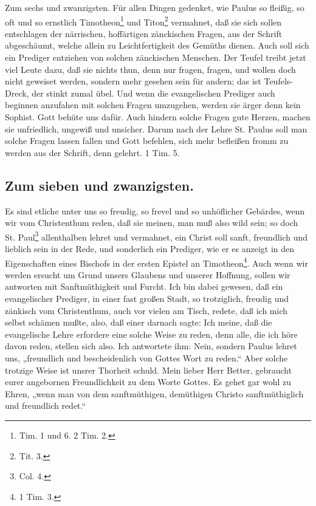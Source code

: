 Zum sechs und zwanzigsten. Für allen Dingen gedenket, wie Paulus so fleißig, so oft und so ernstlich Timotheon\footnote{Tim. 1 und 6. 2 Tim. 2.} und Titon\footnote{Tit. 3.} vermahnet, daß sie sich sollen entschlagen der närrischen, hoffärtigen zänckischen Fragen, aus der Schrift abgeschäumt, welche allein zu Leichtfertigkeit des Gemüths dienen. Auch soll sich ein Prediger entziehen von solchen zänckischen Menschen. Der Teufel treibt jetzt viel Leute dazu, daß sie nichts thun, denn nur fragen, fragen, und wollen doch nicht geweiset werden, sondern mehr gesehen sein für andern; das ist Teufels-Dreck, der stinkt zumal übel. Und wenn die evangelischen Prediger auch beginnen anzufahen mit solchen Fragen umzugehen, werden sie ärger denn kein Sophist. Gott behüte uns dafür. Auch hindern solche Fragen gute Herzen, machen sie unfriedlich, ungewiß und unsicher. Darum nach der Lehre St. Paulus soll man solche Fragen lassen fallen und Gott befehlen, sich mehr befleißen fromm zu werden aus der Schrift, denn gelehrt. 1 Tim. 5.

\subsection*{Zum sieben und zwanzigsten.}

Es sind etliche unter uns so freudig, so frevel und so unhöflicher Gebärdes, wenn wir vom Christenthum reden, daß sie meinen, man muß also wild sein; so doch St. Paul\footnote{Col. 4.} allenthalben lehret und vermahnet, ein Christ soll sanft, freundlich und lieblich sein in der Rede, und sonderlich ein Prediger, wie er es anzeigt in den Eigenschaften eines Bischofs in der ersten Epistel an Timotheon\footnote{1 Tim. 3.}. Auch wenn wir werden ersucht um Grund unsers Glaubens und unserer Hoffnung, sollen wir antworten mit Sanftmüthigkeit und Furcht. Ich bin dabei gewesen, daß ein evangelischer Prediger, in einer fast großen Stadt, so trotziglich, freudig und zänkisch vom Christenthum, auch vor vielen am Tisch, redete, daß ich mich selbst schämen mußte, also, daß einer darnach sagte: Ich meine, daß die evangelische Lehre erfordere eine solche Weise zu reden, denn alle, die ich höre davon reden, stellen sich also. Ich antwortete ihm: Nein, sondern Paulus lehret uns, „freundlich und bescheidenlich von Gottes Wort zu reden.“ Aber solche trotzige Weise ist unsrer Thorheit schuld. Mein lieber Herr Better, gebraucht eurer angebornen Freundlichkeit zu dem Worte Gottes. Es gehet gar wohl zu Ehren, „wenn man von dem sanftmüthigen, demüthigen Christo sanftmüthiglich und freundlich redet.“

